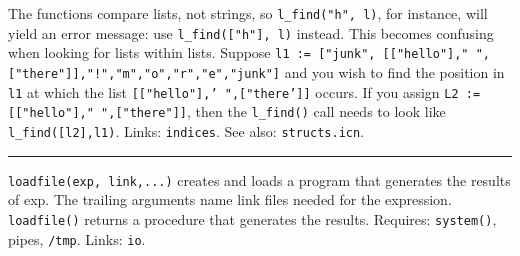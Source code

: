 


The functions compare lists, not strings, so
\texttt{l\_find("h", l)}, for instance,
will yield an error message: use
\texttt{l\_find(["h"], l)} instead. This
becomes confusing when looking for lists within lists. Suppose
\texttt{l1 := ["junk",
[["hello"]," ",["there"]],"!","m","o","r","e","junk"]}
and you wish to find the position in \texttt{l1} at which the list
\texttt{[["hello"],'
",["there']]} occurs. If you
assign \texttt{L2 :=
[["hello"]," ",["there"]]}, then the
\texttt{l\_find()} call needs to look like \texttt{l\_find([l2],l1)}.
Links: \texttt{indices}. See also: \texttt{structs.icn}.

\vspace{0.25cm}\hrule{}

\texttt{loadfile(exp, link,...)} creates and loads a program that
generates the results of exp. The trailing arguments name link files
needed for the expression. \texttt{loadfile()} returns a procedure that
generates the results.
Requires: \texttt{system()}, pipes, \texttt{/tmp}. Links:
\texttt{io}. 

\pagebreak

